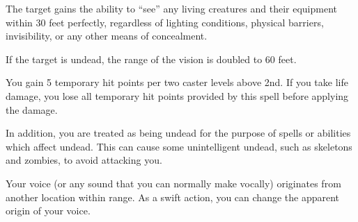 \begin{spellheader}
    \spelldur{\durlong \dismissable}
\end{spellheader}
\begin{spelleffects}
    \spelleffect The target gains the ability to ``see'' any living creatures and their equipment within 30 feet perfectly, regardless of lighting conditions, physical barriers, invisibility, or any other means of concealment.

    If the target is undead, the range of the vision is doubled to 60 feet.
\end{spelleffects}
\begin{spellfooter}

\end{spellfooter}

\begin{spellheader}
    \spelldur{\durlong}
\end{spellheader}
\begin{spelleffects}
    \spelleffect You gain 5 temporary hit points  per two caster levels above 2nd. If you take life damage, you lose all temporary hit points provided by this spell before applying the damage.

    In addition, you are treated as being undead for the purpose of spells or abilities which affect undead. This can cause some unintelligent undead, such as skeletons and zombies, to avoid attacking you.
\end{spelleffects}
\begin{spellfooter}

\end{spellfooter}

\begin{spellheader}
    \spellrng{\rngmed}
    \spelldur{\durshort \dismissable}
\end{spellheader}
\begin{spelleffects}
    \spelleffect Your voice (or any sound that you can normally make vocally) originates from another location within range. As a swift action, you can change the apparent origin of your voice.
\end{spelleffects}
\begin{spellfooter}

\end{spellfooter}

